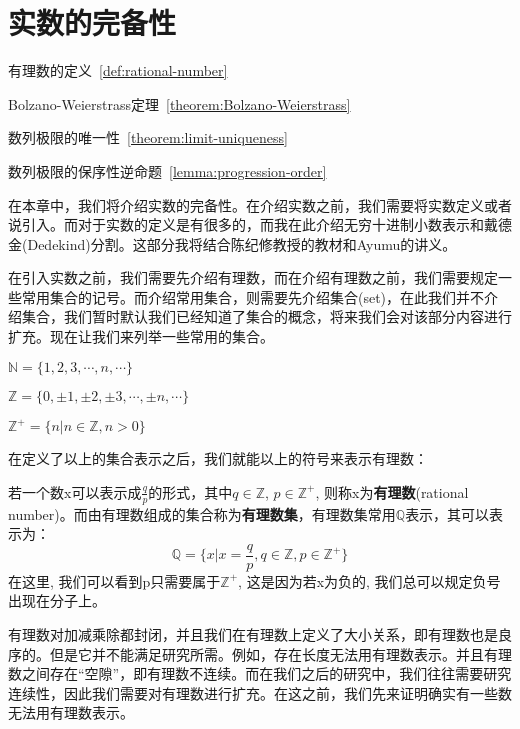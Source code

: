 \chapter{实数的完备性}
\begin{introduction}
  \item 有理数的定义~\ref{def:rational-number}
  \item Bolzano-Weierstrass定理~\ref{theorem:Bolzano-Weierstrass}
  \item 数列极限的唯一性~\ref{theorem:limit-uniqueness}
  \item 数列极限的保序性逆命题~\ref{lemma:progression-order}

\end{introduction}
在本章中，我们将介绍实数的完备性。在介绍实数之前，我们需要将实数定义或者说引入。而对于实数的定义是有很多的，而我在此介绍无穷十进制小数表示和戴德金(Dedekind)分割。这部分我将结合陈纪修教授的教材和Ayumu的讲义。

在引入实数之前，我们需要先介绍有理数，而在介绍有理数之前，我们需要规定一些常用集合的记号。而介绍常用集合，则需要先介绍集合(set)，在此我们并不介绍集合，我们暂时默认我们已经知道了集合的概念，将来我们会对该部分内容进行扩充。现在让我们来列举一些常用的集合。
\begin{definition}[常用集合表示]
$\mathbb{N} = \{ 1, 2, 3, \cdots, n, \cdots\}$

$\mathbb{Z} = \{ 0, \pm 1, \pm 2, \pm 3, \cdots, \pm n, \cdots \}$

$\mathbb{Z}^+ = \{ n | n \in \mathbb{Z}, n > 0 \}$
\end{definition}
在定义了以上的集合表示之后，我们就能以上的符号来表示有理数：
\begin{definition}[有理数] \label{def:rational-number} 
若一个数x可以表示成$\frac{q}{p}$的形式，其中$q \in \mathbb{Z}$, $p \in \mathbb{Z}^+$, 则称x为{\bf 有理数}(rational number)。而由有理数组成的集合称为{\bf 有理数集}，有理数集常用$\mathbb{Q}$表示，其可以表示为：
\[ \mathbb{Q} = \{ x | x = \frac{q}{p}, q \in \mathbb{Z}, p \in \mathbb{Z}^+ \} \]
在这里, 我们可以看到p只需要属于$\mathbb{Z}^+$, 这是因为若x为负的, 我们总可以规定负号出现在分子上。
\end{definition}
有理数对加减乘除都封闭，并且我们在有理数上定义了大小关系，即有理数也是良序的。但是它并不能满足研究所需。例如，存在长度无法用有理数表示。并且有理数之间存在``空隙''，即有理数不连续。而在我们之后的研究中，我们往往需要研究连续性，因此我们需要对有理数进行扩充。在这之前，我们先来证明确实有一些数无法用有理数表示。


